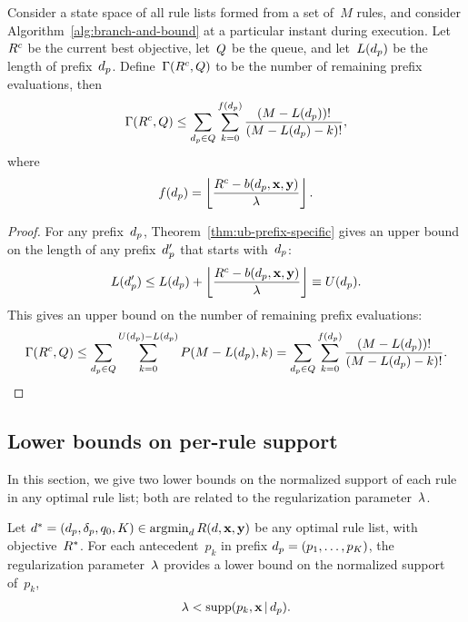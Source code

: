 \begin{corollary}
Consider a state space of all rule lists formed from a set of~$M$ rules,
and consider Algorithm~\ref{alg:branch-and-bound} at a particular instant
during execution.
%
Let~${R^c}$ be the current best objective, let~$Q$ be the queue,
and let~$L(d_p)$ be the length of prefix~$d_p$.
%
Define~${\Gamma({R^c}, Q)}$ to be the number of remaining
prefix evaluations, then
\begin{align}
\Remaining(\CurrentObj, \Queue)
\le \sum_{\Prefix \in Q} \sum_{k=0}^{f(\Prefix)} \frac{(M - L(\Prefix))!}{(M - L(\Prefix) - k)!},
\end{align}
where
\begin{align}
f(\Prefix) = \left\lfloor \frac{\CurrentObj - b(\Prefix, \x, \y)}{\Reg} \right\rfloor.
\label{eq:f}
\end{align}
\end{corollary}

\begin{proof}
For any prefix~$d_p$, Theorem~\ref{thm:ub-prefix-specific}
gives an upper bound on the length of any prefix~$d_p'$
that starts with~$d_p$:
\begin{align}
L(\Prefix') \le L(\Prefix) + \left\lfloor \frac{\CurrentObj - b(\Prefix, \x, \y)}{\Reg} \right\rfloor
\equiv U(\Prefix).
\end{align}
This gives an upper bound on the number of remaining prefix evaluations:
\begin{align}
\Remaining(\CurrentObj, \Queue)
\le \sum_{\Prefix \in Q} \sum_{k=0}^{U(\Prefix) - L(\Prefix)} P(M - L(\Prefix), k)
= \sum_{\Prefix \in Q} \sum_{k=0}^{f(\Prefix)} \frac{(M - L(\Prefix))!}{(M - L(\Prefix) - k)!}.
\end{align}
\end{proof}

\subsection{Lower bounds on per-rule support}
\label{sec:lb-support}

In this section, we give two lower bounds on the normalized support
of each rule in any optimal rule list;
both are related to the regularization parameter~${\lambda}$.

\begin{theorem}
\label{thm:min-capture}
Let ${d^* = (d_p, \delta_p, q_0, K) \in \operatorname*{argmin}_{d} R({d}, \mathbf{x}, \mathbf{y})}$
be any optimal rule list, with objective~$R^*$.
%
For each antecedent~$p_k$ in prefix ${d_p = (p_1, \dots, p_K)}$,
the regularization parameter~${\lambda}$ provides a lower bound
on the normalized support of~$p_k$,
\begin{align}
\Reg < \Supp(p_k, \x \given \Prefix).
\label{eq:min-capture}
\end{align}
\end{theorem}

